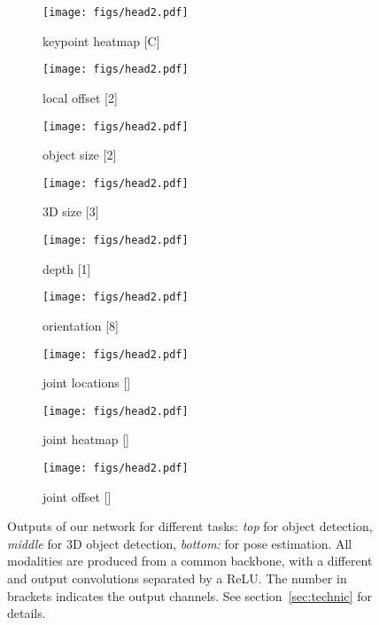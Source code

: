\documentclass[10pt,twocolumn,letterpaper]{article}
\begin{document}
\begin{figure}[t]
  \begin{subfigure}[t]{0.33\linewidth}
   \centering
   \texttt{[image: figs/head2.pdf]}
   \caption*{keypoint heatmap [C]}
  \end{subfigure}\begin{subfigure}[t]{0.33\linewidth}
   \centering
   \texttt{[image: figs/head2.pdf]}
   \caption*{local offset [2]}
  \end{subfigure}\begin{subfigure}[t]{0.33\linewidth}
   \centering
   \texttt{[image: figs/head2.pdf]}
   \caption*{object size [2]}
  \end{subfigure}
  
  \begin{subfigure}[t]{0.33\linewidth}
   \centering
   \texttt{[image: figs/head2.pdf]}
   \caption*{3D size [3]}
  \end{subfigure}\begin{subfigure}[t]{0.33\linewidth}
   \centering
   \texttt{[image: figs/head2.pdf]}
   \caption*{depth [1]}
  \end{subfigure}\begin{subfigure}[t]{0.33\linewidth}
   \centering
   \texttt{[image: figs/head2.pdf]}
   \caption*{orientation [8]}
  \end{subfigure}

  \begin{subfigure}[t]{0.33\linewidth}
   \centering
   \texttt{[image: figs/head2.pdf]}
   \caption*{joint locations []}
  \end{subfigure}\begin{subfigure}[t]{0.33\linewidth}
   \centering
   \texttt{[image: figs/head2.pdf]}
   \caption*{joint heatmap []}
  \end{subfigure}\begin{subfigure}[t]{0.33\linewidth}
   \centering
   \texttt{[image: figs/head2.pdf]}
   \caption*{joint offset []}
  \end{subfigure}
    \vspace{-2.5mm}
   \caption{Outputs of our network for different tasks: \emph{top} for object detection, \emph{middle} for 3D object detection, \emph{bottom:} for pose estimation. All modalities are produced from a common backbone, with a different  and  output convolutions separated by a ReLU. The number in brackets indicates the output channels. See section~\ref{sec:technic} for details.}
\label{fig:head}
\end{figure}
\end{document}
